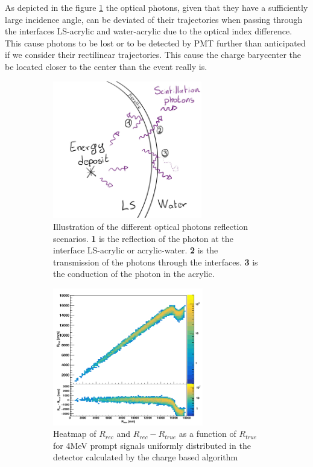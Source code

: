 \documentclass[../main.tex]{subfiles}
\begin{document}
As depicted in the figure \ref{fig:juno:rec:refl} the optical photons, given that they have a sufficiently large incidence angle, can be deviated of their trajectories when passing through the interfaces LS-acrylic and water-acrylic due to the optical index difference. This cause photons to be lost or to be detected by PMT further than anticipated if we consider their rectilinear trajectories. This cause the charge barycenter the be located closer to the center than the event really is.

\begin{figure}[ht]
  \begin{subfigure}[t]{0.48\textwidth}
    \centering
    \includegraphics[height=6cm]{images/juno/reco/Reflexion_scenarii.jpg}
    \caption{Illustration of the different optical photons reflection scenarios. \textbf{1} is the reflection of the photon at the interface LS-acrylic or acrylic-water. \textbf{2} is the transmission of the photons through the interfaces. \textbf{3} is the conduction of the photon in the acrylic.}
    \label{fig:juno:rec:refl}
  \end{subfigure}
  \hfill
  \begin{subfigure}[t]{0.48\textwidth}
    \centering
    \includegraphics[height=6cm]{images/juno/reco/charge_barycenter.png}
    \caption{Heatmap of $R_{rec}$ and $R_{rec} - R_{true}$ as a function of $R_{true}$ for 4MeV prompt signals uniformly distributed in the detector calculated by the charge based algorithm}
    \label{fig:juno:rec:cbary}
  \end{subfigure}
  \caption{}
\end{figure}
\end{document}
